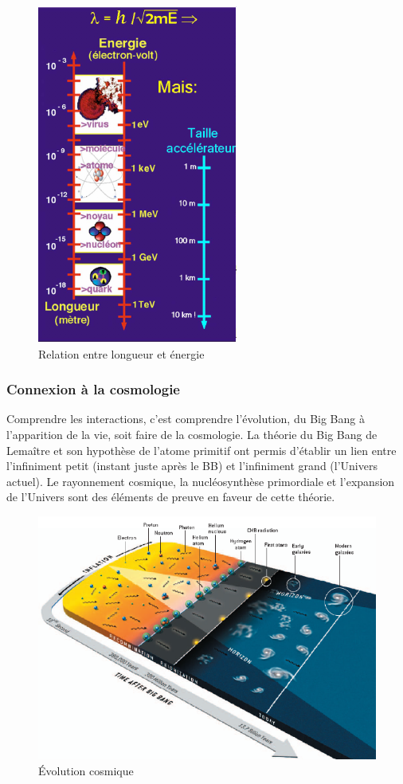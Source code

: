 \begin{figure}[ht]
    \centering
    \includegraphics[scale=0.75]{Images1/echelles.png}
    \caption{Relation entre longueur et énergie}
    \label{fig:longeur_energie}
\end{figure}

\subsubsection{Connexion à la cosmologie}
Comprendre les interactions, c'est comprendre l'évolution, du Big Bang à l'apparition de la vie, soit faire de la cosmologie. La théorie du Big Bang de Lemaître et son hypothèse de l'atome primitif ont permis d'établir un lien entre l'infiniment petit (instant juste après le BB) et l'infiniment grand (l'Univers actuel).  Le rayonnement cosmique, la nucléosynthèse primordiale et l'expansion de l'Univers sont des éléments de preuve en faveur de cette théorie.

\begin{figure}[ht]
    \centering
    \includegraphics[scale=0.65]{Images1/univers.png}
    \caption{Évolution cosmique}
    \label{fig:evolution_cosmos}
\end{figure}

